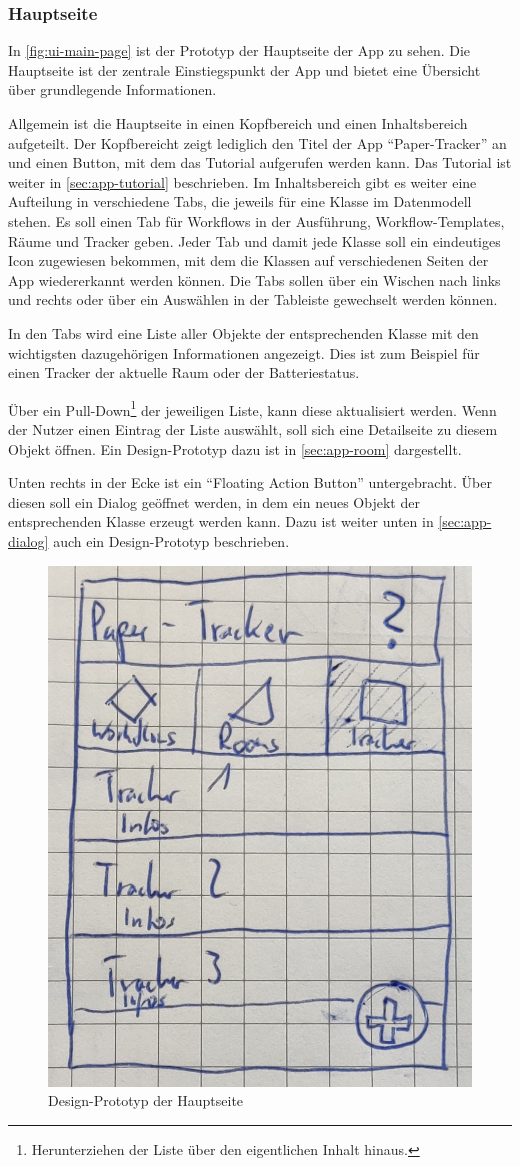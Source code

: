 \FloatBarrier
\subsubsection{Hauptseite}

In \autoref{fig:ui-main-page} ist der Prototyp der Hauptseite der App zu sehen.
Die Hauptseite ist der zentrale Einstiegspunkt der App und bietet eine Übersicht über grundlegende
Informationen.

Allgemein ist die Hauptseite in einen Kopfbereich und einen Inhaltsbereich aufgeteilt.
Der Kopfbereicht zeigt lediglich den Titel der App \enquote{Paper-Tracker} an und einen Button, mit dem das Tutorial aufgerufen werden kann.
Das Tutorial ist weiter in \autoref{sec:app-tutorial} beschrieben.
Im Inhaltsbereich gibt es weiter eine Aufteilung in verschiedene Tabs, die jeweils für eine Klasse im Datenmodell stehen.
Es soll einen Tab für Workflows in der Ausführung, Workflow-Templates, Räume und Tracker geben.
Jeder Tab und damit jede Klasse soll ein eindeutiges Icon zugewiesen bekommen, mit dem die Klassen auf verschiedenen Seiten der App wiedererkannt werden können.
Die Tabs sollen über ein Wischen nach links und rechts oder über ein Auswählen in der Tableiste gewechselt werden können.

In den Tabs wird eine Liste aller Objekte der entsprechenden Klasse mit den wichtigsten dazugehörigen Informationen angezeigt.
Dies ist zum Beispiel für einen Tracker der aktuelle Raum oder der Batteriestatus.

Über ein Pull-Down\footnote{Herunterziehen der Liste über den eigentlichen Inhalt hinaus.} der jeweiligen Liste, kann diese aktualisiert werden.
Wenn der Nutzer einen Eintrag der Liste auswählt, soll sich eine Detailseite zu diesem Objekt öffnen.
Ein Design-Prototyp dazu ist in \autoref{sec:app-room} dargestellt.

Unten rechts in der Ecke ist ein \enquote{Floating Action Button} untergebracht.
Über diesen soll ein Dialog geöffnet werden, in dem ein neues Objekt der entsprechenden Klasse erzeugt werden kann.
Dazu ist weiter unten in \autoref{sec:app-dialog} auch ein Design-Prototyp beschrieben.

\begin{figure}[h!tbp]
	\includegraphics[width=.4\textwidth]{images/ui-prototype/main_page.jpg}
	\centering
	\caption{Design-Prototyp der Hauptseite}
	\label{fig:ui-main-page}
\end{figure}

